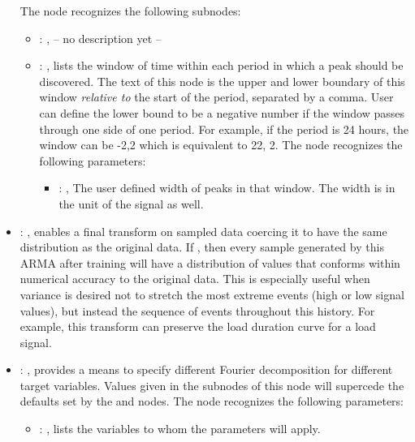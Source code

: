 \begin{itemize}
      The  node recognizes the following subnodes:
      \begin{itemize}
        \item {}: ,
          -- no description yet --

        \item {}: ,
          lists the window of time within each period in which a peak should be discovered.
          The text of this node is the upper and lower boundary of this
          window \emph{relative to} the start of the period, separated by a comma.
          User can define the lower bound to be a negative
          number if the window passes through one side of one period. For example, if the period is
          24                                                  hours, the window can be -2,2 which is
          equivalent to 22, 2.
          The  node recognizes the following parameters:
            \begin{itemize}
              \item {}: ,
                The user defined  width of peaks in that window. The width is in the unit of the
                signal as well.
          \end{itemize}
      \end{itemize}

    \item {}: ,
      enables a final transform on sampled                                                    data
      coercing it to have the same distribution as the original data. If , then
      every                                                    sample generated by this ARMA after
      training will have a distribution of values that conforms within
      numerical accuracy to the original data. This is especially useful when variance is desired
      not to stretch                                                    the most extreme events
      (high or low signal values), but instead the sequence of events throughout this
      history. For example, this transform can preserve the load duration curve for a load signal.

    \item {}: ,
      provides a means to specify different Fourier
      decomposition for different target variables.  Values given in the subnodes of this node will
      supercede                                                    the defaults set by the
       and  nodes.
      The  node recognizes the following parameters:
        \begin{itemize}
          \item {}: ,
            lists the variables to whom                     the  parameters
            will apply.
      \end{itemize}


\end{itemize}
